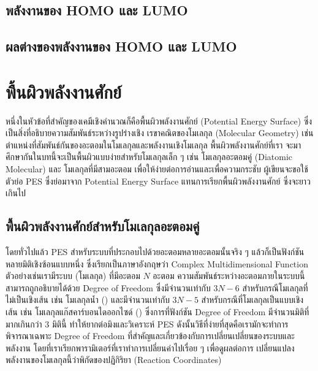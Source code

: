 

\subsection{พลังงานของ HOMO และ LUMO}
\label{ssec:ener_homo_lumo}



\subsection{ผลต่างของพลังงานของ HOMO และ LUMO}
\label{sec:ener_diff_orb}


\section{พื้นผิวพลังงานศักย์}
\label{sec:pef}

หนึ่งในหัวข้อที่สำคัญของเคมีเชิงคำนวณก็คือพื้นผิวพลังงานศักย์ (Potential Energy Surface) ซึ่งเป็นสิ่งที่อธิบายความสัมพันธ์ระหว่างรูปร่างเชิง%
เรขาคณิตของโมเลกุล (Molecular Geometry) เช่น ตำแหน่งที่สัมพันธ์กันของอะตอมในโมเลกุลและพลังงานเชิงโมเลกุล พื้นผิวพลังงานศักย์ที่เรา%
จะมาศึกษากันในบทนี้จะเป็นพื้นผิวแบบง่ายสำหรับโมเลกุลเล็ก ๆ เช่น โมเลกุลอะตอมคู่ (Diatomic Molecular) และ โมเลกุลที่มีสามอะตอม 
เพื่อให้ง่ายต่อการอ่านและเพื่อความกระชับ ผู้เขียนจะขอใช้ตัวย่อ PES ซึ่งย่อมาจาก Potential Energy Surface แทนการเรียกพื้นผิวพลังงานศักย์%
ซึ่งจะยาวเกินไป

\subsection{พื้นผิวพลังงานศักย์สำหรับโมเลกุลอะตอมคู่}
\label{ssec:pef_di_atomic}

โดยทั่วไปแล้ว PES สำหรับระบบที่ประกอบไปด้วยอะตอมหลายอะตอมนั้นจริง ๆ แล้วก็เป็นฟังก์ชันหลายมิติเชิงซ้อนแบบหนึ่ง ซึ่งเรียกเป็นภาษาอังกฤษว่า
Complex Multidimensional Function ตัวอย่างเช่นเรามีระบบ (โมเลกุล) ที่มีอะตอม $N$ อะตอม ความสัมพันธ์ระหว่างอะตอมภายในระบบนี้%
สามารถถูกอธิบายได้ด้วย Degree of Freedom ซึ่งมีจำนวนเท่ากับ $3N-6$ สำหรับกรณีโมเลกุลที่ไม่เป็นเชิงเส้น เช่น โมเลกุลน้ำ () 
และมีจำนวนเท่ากับ $3N-5$ สำหรับกรณีที่โมเลกุลเป็นแบบเชิงเส้น เช่น โมเลกุลแก๊สคาร์บอนไดออกไซด์ () ซึ่งการที่ฟังก์ชัน Degree 
of Freedom มีจำนวนมิติที่มากเกินกว่า 3 มิตินี้ ทำให้ยากต่อมิงและวิเคราะห์ PES ดังนั้นวิธีที่ง่ายที่สุดคือเรามักจะทำการพิจารณาเฉพาะ Degree of 
Freedom ที่สำคัญและเกี่ยวข้องกับการเปลี่ยนเปลี่ยนของระบบและพลังงาน โดยที่เราเรียกพารามิเตอร์ที่เราทำการเปลี่ยนค่าไปเรื่อย ๆ เพื่อดูผลต่อการ%
เปลี่ยนแปลงพลังงานของโมเลกุลนี้ว่าพิกัดของปฏิกิริยา (Reaction Coordinates) 

